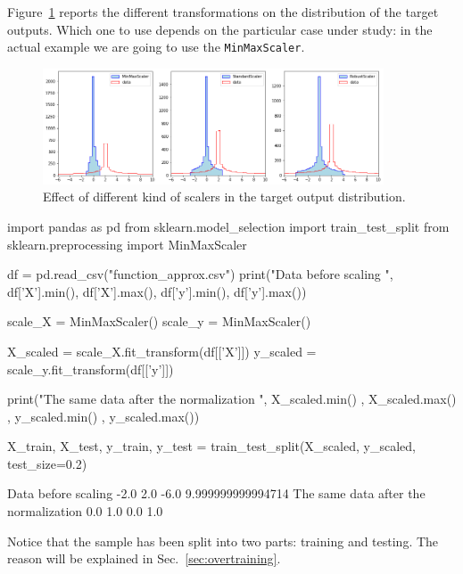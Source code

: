 Figure~\ref{fig:scalers} reports the different transformations on the distribution of the target outputs. Which one to use depends on the particular case under study: in the actual example we are going to use the \texttt{MinMaxScaler}.

\begin{figure}[htb]
\centering
\includegraphics[width=0.9\textwidth]{figures/scalers}
\caption{Effect of different kind of scalers in the target output distribution.}
\label{fig:scalers}
\end{figure}

\begin{ipython}
import pandas as pd
from sklearn.model_selection import train_test_split
from sklearn.preprocessing import MinMaxScaler

df = pd.read_csv("function_approx.csv")
print("Data before scaling ", df['X'].min(), df['X'].max(),
                              df['y'].min(), df['y'].max())

scale_X = MinMaxScaler()
scale_y = MinMaxScaler()

X_scaled = scale_X.fit_transform(df[['X']])
y_scaled = scale_y.fit_transform(df[['y']])

print("The same data after the normalization ", X_scaled.min()
                                              , X_scaled.max()
                                              , y_scaled.min()
                                              , y_scaled.max())

X_train, X_test, y_train, y_test = train_test_split(X_scaled, 
                                                    y_scaled, 
                                                    test_size=0.2)
\end{ipython}
\begin{ioutput}
Data before scaling -2.0 2.0 -6.0 9.999999999994714
The same data after the normalization  0.0 1.0 0.0 1.0
\end{ioutput}

Notice that the sample has been split into two parts: training and testing. The reason will be explained in Sec.~\ref{sec:overtraining}.



